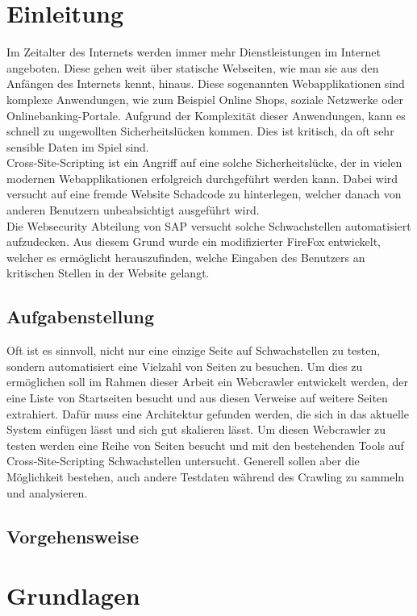 \chapter{Einleitung}
Im Zeitalter des Internets werden immer mehr Dienstleistungen im Internet angeboten. Diese gehen weit über statische Webseiten, wie man sie aus den Anfängen des Internets kennt, hinaus. Diese sogenannten Webapplikationen sind komplexe Anwendungen, wie zum Beispiel Online Shops, soziale Netzwerke oder Onlinebanking-Portale. Aufgrund der Komplexität dieser Anwendungen, kann es schnell zu ungewollten Sicherheitslücken kommen. Dies ist kritisch, da oft sehr sensible Daten im Spiel sind. \\
Cross-Site-Scripting ist ein Angriff auf eine solche Sicherheitslücke, der in vielen modernen Webapplikationen erfolgreich durchgeführt werden kann. Dabei wird versucht auf eine fremde Website Schadcode zu hinterlegen, welcher danach von anderen Benutzern unbeabsichtigt ausgeführt wird. \\
Die Websecurity Abteilung von SAP versucht solche Schwachstellen automatisiert aufzudecken. Aus diesem Grund wurde ein modifizierter FireFox entwickelt, welcher es ermöglicht herauszufinden, welche Eingaben des Benutzers an kritischen Stellen in der Website gelangt.
\section{Aufgabenstellung}
Oft ist es sinnvoll, nicht nur eine einzige Seite auf Schwachstellen zu testen, sondern automatisiert eine Vielzahl von Seiten zu besuchen. Um dies zu ermöglichen soll im Rahmen dieser Arbeit ein Webcrawler entwickelt werden, der eine Liste von Startseiten besucht und aus diesen Verweise auf weitere Seiten extrahiert. 
Dafür muss eine Architektur gefunden werden, die sich in das aktuelle System einfügen lässt und sich gut skalieren lässt. Um diesen Webcrawler zu testen werden eine Reihe von Seiten besucht und mit den bestehenden Tools auf Cross-Site-Scripting Schwachstellen untersucht. Generell sollen aber die Möglichkeit bestehen, auch andere Testdaten während des Crawling zu sammeln und analysieren.
\section{Vorgehensweise}

\chapter{Grundlagen}
